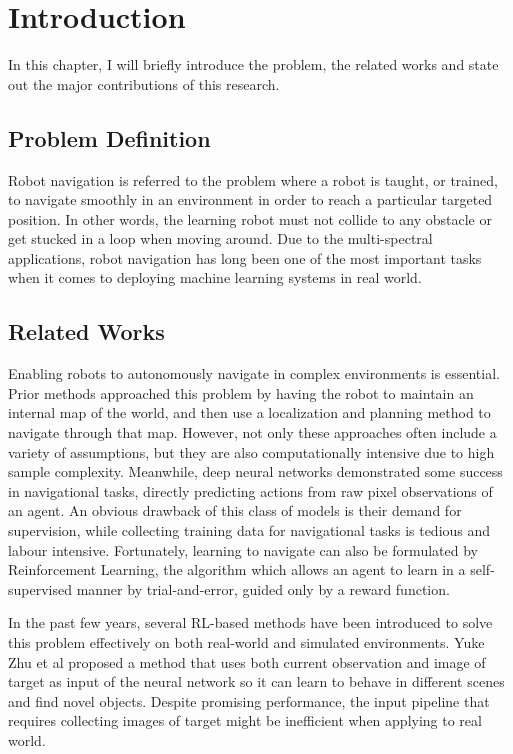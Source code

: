 \chapter{Introduction}
In this chapter, I will briefly introduce the problem, the related works and state out the major contributions of this research.


\section{Problem Definition}

Robot navigation is referred to the problem where a robot is taught, or trained, to navigate smoothly in an environment in order to reach a particular targeted position. In other words, the learning robot must not collide to any obstacle or get stucked in a loop when moving around. Due to the multi-spectral applications, robot navigation has long been one of the most important tasks when it comes to deploying machine learning systems in real world.

\section{Related Works}
Enabling robots to autonomously navigate in complex environments is essential. Prior methods approached this problem by having the robot to maintain an internal map of the world, and then use a localization and planning method to navigate through that map. However, not only these approaches often include a variety of assumptions, but they are also computationally intensive due to high sample complexity. Meanwhile, deep neural networks demonstrated some success in navigational tasks, directly predicting actions from raw pixel observations of an agent. An obvious drawback of this class of models is their demand for supervision, while collecting training data for navigational tasks is tedious and labour intensive. Fortunately, learning to navigate can also be formulated by Reinforcement Learning, the algorithm which allows an agent to learn in a self-supervised manner by trial-and-error, guided only by a reward function. 

In the past few years, several RL-based methods have been introduced to solve this problem effectively on both real-world and simulated environments. Yuke Zhu et al  \cite{yuzhu} proposed a method that uses both current observation and image of target as input of the neural network so it can learn to behave in different scenes and find novel objects. Despite promising performance, the input pipeline that requires collecting images of target might be inefficient when applying to real world.

